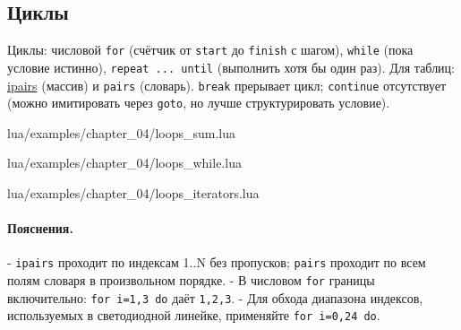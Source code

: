 \subsection{Циклы}
Циклы: числовой \verb|for| (счётчик от \verb|start| до \verb|finish| с шагом), \verb|while| (пока условие истинно), \verb|repeat ... until| (выполнить хотя бы один раз). Для таблиц: \hyperlink{term:ipairs}{ipairs} (массив) и \verb|pairs| (словарь). \verb|break| прерывает цикл; \verb|continue| отсутствует (можно имитировать через \verb|goto|, но лучше структурировать условие).
\begin{codefile}{lua/examples/chapter_04/loops_sum.lua}
\end{codefile}
\begin{codefile}{lua/examples/chapter_04/loops_while.lua}
\end{codefile}
\begin{codefile}{lua/examples/chapter_04/loops_iterators.lua}
\end{codefile}
\paragraph{Пояснения.}
- \verb|ipairs| проходит по индексам 1..N без пропусков; \verb|pairs| проходит по всем полям словаря в произвольном порядке.
- В числовом \verb|for| границы включительно: \verb|for i=1,3 do| даёт \verb|1,2,3|.
- Для обхода диапазона индексов, используемых в светодиодной линейке, применяйте \verb|for i=0,24 do|.
